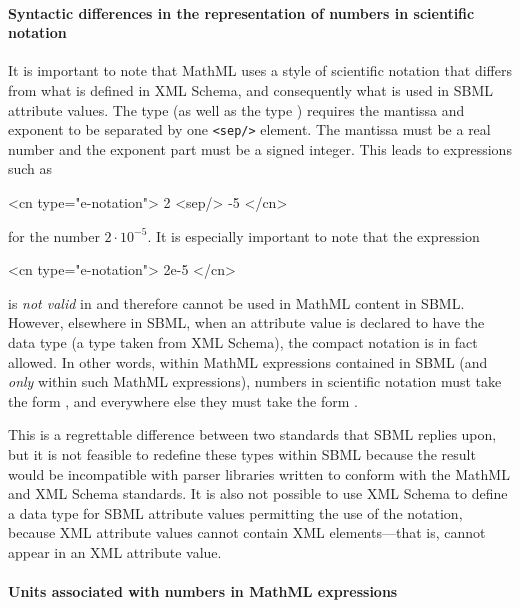 \paragraph{Syntactic differences in the representation of numbers
  in scientific notation}

It is important to note that MathML uses a style of scientific
notation that differs from what is defined in XML Schema, and
consequently what is used in SBML attribute values.  The
\mathmltwo type 
(as well as the type )
requires the mantissa and
exponent to be separated by one \texttt{<sep/>} element.  The
mantissa must be a real number and the exponent part must be a
signed integer.  This leads to expressions such as

\begin{example}
<cn type="e-notation"> 2 <sep/> -5 </cn>
\end{example}

for the number $2 \cdot 10^{-5}$.  It is especially
important to note that the expression

\begin{example}
<cn type="e-notation"> 2e-5 </cn>
\end{example}

is \emph{not valid} in \mathmltwo and therefore cannot be used in
MathML content in SBML.  However, elsewhere in SBML, when an
attribute value is declared to have the data type
 (a type taken from XML Schema), the compact
notation  is in fact allowed.  In other words, within
MathML expressions contained in SBML (and \emph{only} within such
MathML expressions), numbers in scientific notation must take the
form , and
everywhere else they must take the form .

This is a regrettable difference between two standards that SBML
replies upon, but it is not feasible to redefine these types
within SBML because the result would be incompatible with parser
libraries written to conform with the MathML and XML Schema
standards.  It is also not possible to use XML Schema to define a
data type for SBML attribute values permitting the use of the
 notation, because XML attribute values cannot
contain XML elements---that is,  cannot appear in an
XML attribute value.


\paragraph{Units associated with numbers in MathML  expressions}
\label{sec:units-of-mathml}

